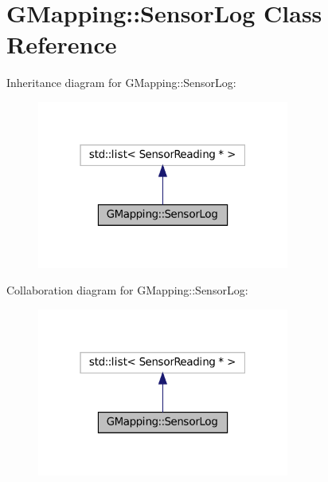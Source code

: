 \hypertarget{classGMapping_1_1SensorLog}{}\section{G\+Mapping\+:\+:Sensor\+Log Class Reference}
\label{classGMapping_1_1SensorLog}


Inheritance diagram for G\+Mapping\+:\+:Sensor\+Log\+:
\nopagebreak
\begin{figure}[H]
\begin{center}
\leavevmode
\includegraphics[width=235pt]{classGMapping_1_1SensorLog__inherit__graph}
\end{center}
\end{figure}


Collaboration diagram for G\+Mapping\+:\+:Sensor\+Log\+:
\nopagebreak
\begin{figure}[H]
\begin{center}
\leavevmode
\includegraphics[width=235pt]{classGMapping_1_1SensorLog__coll__graph}
\end{center}
\end{figure}

